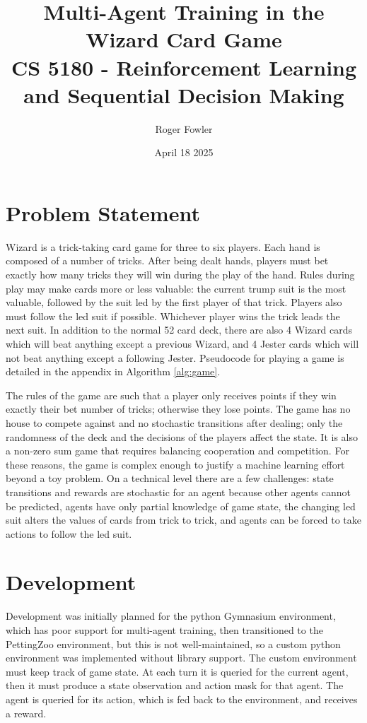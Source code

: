 \documentclass[10pt]{article} %
\title{\vspace{-2cm}Multi-Agent Training in the Wizard Card Game\\{\large CS 5180 - Reinforcement Learning and Sequential Decision Making}}
\author{Roger Fowler}
\date{April 18 2025}
\begin{document}
\maketitle

\section{Problem Statement}

Wizard is a trick-taking card game for three to six players. Each hand is composed of a number of tricks. After being dealt hands, players must bet exactly how many tricks they will win during the play of the hand. Rules during play may make cards more or less valuable: the current trump suit is the most valuable, followed by the suit led by the first player of that trick. Players also must follow the led suit if possible. Whichever player wins the trick leads the next suit. In addition to the normal 52 card deck, there are also 4 Wizard cards which will beat anything except a previous Wizard, and 4 Jester cards which will not beat anything except a following Jester. Pseudocode for playing a game is detailed in the appendix in Algorithm \ref{alg:game}.

The rules of the game are such that a player only receives points if they win exactly their bet number of tricks; otherwise they lose points. The game has no house to compete against and no stochastic transitions after dealing; only the randomness of the deck and the decisions of the players affect the state. It is also a non-zero sum game that requires balancing cooperation and competition. For these reasons, the game is complex enough to justify a machine learning effort beyond a toy problem. On a technical level there are a few challenges: state transitions and rewards are stochastic for an agent because other agents cannot be predicted, agents have only partial knowledge of game state, the changing led suit alters the values of cards from trick to trick, and agents can be forced to take actions to follow the led suit.

\section{Development}

Development was initially planned for the python Gymnasium environment, which has poor support for multi-agent training, then transitioned to the PettingZoo environment, but this is not well-maintained, so a custom python environment was implemented without library support. The custom environment must keep track of game state. At each turn it is queried for the current agent, then it must produce a state observation and action mask for that agent. The agent is queried for its action, which is fed back to the environment, and receives a reward.
\end{document}

